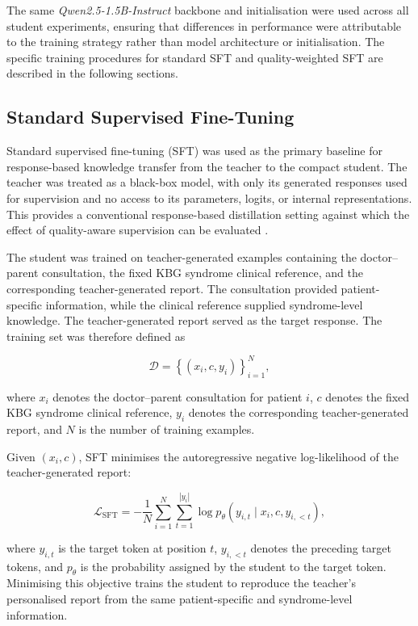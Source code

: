 \documentclass[ %
                    author={Aman Kumar Singh},
                supervisor={Dr. Edwin Simpson},
                    degree={MSc},
                     title={Quality-Aware Knowledge Distillation of Large Language Models for Efficient Personalised Clinical Report Generation},
                  subtitle={},
                      type={},
                      year={2021}]{dissertation}
\begin{document}
The same \textit{Qwen2.5-1.5B-Instruct} backbone and initialisation were used
across all student experiments, ensuring that differences in performance
were attributable to the training strategy rather than model architecture
or initialisation. The specific training procedures for standard SFT and
quality-weighted SFT are described in the following sections.
\subsection{Standard Supervised Fine-Tuning}

Standard supervised fine-tuning (SFT) was used as the primary baseline for
response-based knowledge transfer from the teacher to the compact student.
The teacher was treated as a black-box model, with only its generated
responses used for supervision and no access to its parameters, logits, or
internal representations. This provides a conventional response-based
distillation setting against which the effect of quality-aware supervision
can be evaluated \cite{song_exploring_2023}.

The student was trained on teacher-generated examples containing the
doctor--parent consultation, the fixed KBG syndrome clinical reference, and
the corresponding teacher-generated report. The consultation provided
patient-specific information, while the clinical reference supplied
syndrome-level knowledge. The teacher-generated report served as the target
response. The training set was therefore defined as

\begin{equation}
\mathcal{D}
=
\left\{
(x_i,c,y_i)
\right\}_{i=1}^{N},
\end{equation}

where $x_i$ denotes the doctor--parent consultation for patient $i$, $c$
denotes the fixed KBG syndrome clinical reference, $y_i$ denotes the
corresponding teacher-generated report, and $N$ is the number of training
examples.

Given $(x_i,c)$, SFT minimises the autoregressive negative log-likelihood of
the teacher-generated report:

\begin{equation}
\mathcal{L}_{\mathrm{SFT}}
=
-\frac{1}{N}
\sum_{i=1}^{N}
\sum_{t=1}^{|y_i|}
\log
p_{\theta}
\left(
y_{i,t}
\mid
x_i,c,y_{i,<t}
\right),
\label{eq:sft_loss}
\end{equation}

where $y_{i,t}$ is the target token at position $t$, $y_{i,<t}$ denotes the
preceding target tokens, and $p_{\theta}$ is the probability assigned by the
student to the target token. Minimising this objective trains the student to
reproduce the teacher's personalised report from the same patient-specific
and syndrome-level information.
\end{document}
